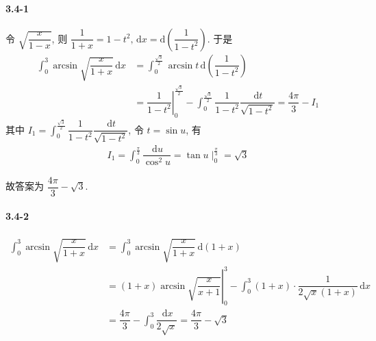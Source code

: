 \paragraph*{3.4-1} 令 $\sqrt{\dfrac{x}{1-x}}$, 则 $\dfrac{1}{1+x}=1-t^2,\,\mathrm{d}x=\mathrm d\left(\dfrac{1}{1-t^2}\right)$. 于是
\[
	\begin{aligned}
\int_{0}^3\arcsin\sqrt{\dfrac{x}{1+x}}\,\mathrm dx&=\int_{0}^{\frac{\sqrt{3}}{2}}\arcsin t\,\mathrm d\left(\dfrac{1}{1-t^2}\right)\\
&=\left.\dfrac{1}{1-t^2}\right|_{0}^{\frac{\sqrt{3}}{2}}-\int_{0}^{\frac{\sqrt{3}}{2}}\dfrac{1}{1-t^2}\dfrac{\,\mathrm dt}{\sqrt{1-t^2}}=\dfrac{4\pi}{3}-I_1
	\end{aligned}
\]
其中 $I_1=\displaystyle\int_{0}^{\frac{\sqrt{3}}{2}}\dfrac{1}{1-t^2}\dfrac{\,\mathrm dt}{\sqrt{1-t^2}}$, 令 $t=\sin u$, 有
\[
	\begin{aligned}
I_1=\int_{0}^{\frac{\pi}{3}}\dfrac{\,\mathrm du}{\cos^2 u}=\tan u\mid_{0}^{\frac{\pi}{3}}=\sqrt{3}
	\end{aligned}
\]

故答案为 $\dfrac{4\pi}{3}-\sqrt{3}$.
\paragraph*{3.4-2} 
\[
\begin{aligned}
\int_{0}^3\arcsin\sqrt{\dfrac{x}{1+x}}\,\mathrm dx&=\int_{0}^{3}\arcsin \sqrt{\dfrac{x}{1+x}}\,\mathrm d(1+x)\\
&=\left.(1+x)\arcsin\sqrt{\dfrac{x}{x+1}}\right|_{0}^{3}-\int_{0}^3(1+x)\cdot\dfrac{1}{2\sqrt{x}(1+x)}\,\mathrm{d}x\\
&=\dfrac{4\pi}{3}-\int_0^3\dfrac{\,\mathrm{d}x}{2\sqrt{x}}=\dfrac{4\pi}{3}-\sqrt{3}
\end{aligned}
\]
